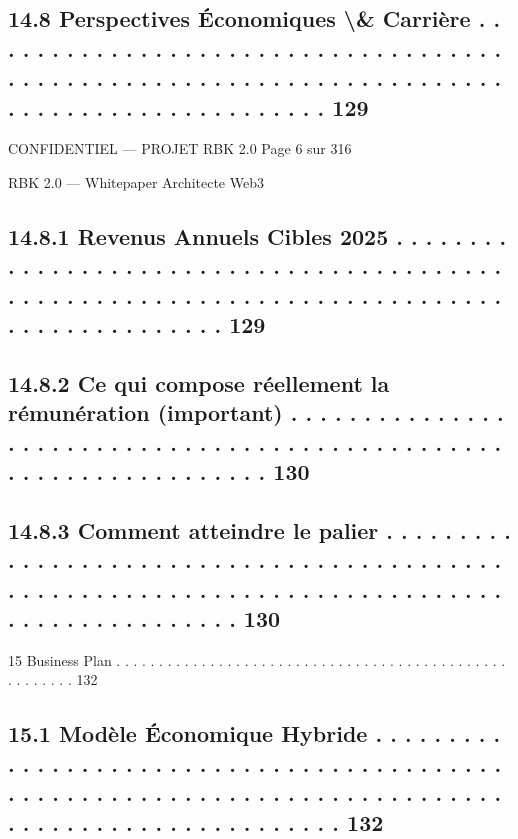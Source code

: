 \documentclass[12pt,landscape,a4paper]{article}
\newenvironment{confidential}
{\begin{tcolorbox}[
    colback=rbkred!5!white,
    colframe=rbkred!75!black,
    title=CONFIDENTIEL,
    fonttitle=\bfseries\color{white},
    coltitle=rbkred!75!black,
    breakable,
    enhanced,
    frame hidden,
    borderline west={2pt}{0pt}{rbkred!75!black}
]}
{\end{tcolorbox}}
\begin{document}
\subsection{14.8    Perspectives Économiques \textbackslash{}& Carrière . . . . . . . . . . . . . . . . . . . . . . . . . . . . . . . . . . . . . . . . . . . . . . . . . . . . . . . . . . . . . . . . . . . . . . . . . . . . . . . . . . . . . . . . . . . . 129}
\vspace{0.5em}
\vspace{0.5em}
\begin{confidential}CONFIDENTIEL — PROJET RBK 2.0                                                                       Page 6 sur 316\end{confidential}
RBK 2.0 — Whitepaper Architecte Web3\\
\vspace{0.5em}
\vspace{0.5em}
\subsection{14.8.1              Revenus Annuels Cibles 2025 . . . . . . . . . . . . . . . . . . . . . . . . . . . . . . . . . . . . . . . . . . . . . . . . . . . . . . . . . . . . . . . . . . . . . . . . . . . . . . . . . . . . . . . . . . . 129}
\subsection{14.8.2              Ce qui compose réellement la rémunération (important) . . . . . . . . . . . . . . . . . . . . . . . . . . . . . . . . . . . . . . . . . . . . . . . . . . . . . . . . . . . . . . . . . . . 130}
\subsection{14.8.3              Comment atteindre le palier . . . . . . . . . . . . . . . . . . . . . . . . . . . . . . . . . . . . . . . . . . . . . . . . . . . . . . . . . . . . . . . . . . . . . . . . . . . . . . . . . . . . . . . . . . . . . 130}
\vspace{0.5em}
15    Business Plan . . . . . . . . . . . . . . . . . . . . . . . . . . . . . . . . . . . . . . . . . . . . . . . . . . . . . . 132\\
\subsection{15.1    Modèle Économique Hybride . . . . . . . . . . . . . . . . . . . . . . . . . . . . . . . . . . . . . . . . . . . . . . . . . . . . . . . . . . . . . . . . . . . . . . . . . . . . . . . . . . . . . . . . . . . . . . . . . . . . 132}
\end{document}
